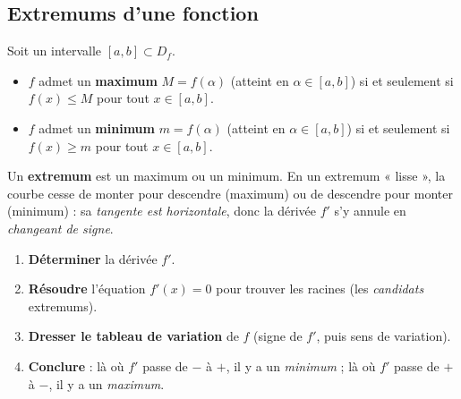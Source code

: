\documentclass[11pt,a4paper]{article}
\newcommand{\Df}{D_f}
\begin{document}
\subsection{Extremums d'une fonction}

\begin{definition}
Soit un intervalle $[a,b]\subset\Df$.
\begin{itemize}[leftmargin=1.5em,topsep=2pt]
  \item $f$ admet un \textbf{maximum} $M=f(\alpha)$ (atteint en $\alpha\in[a,b]$) si et
        seulement si $f(x)\leq M$ pour tout $x\in[a,b]$.
  \item $f$ admet un \textbf{minimum} $m=f(\alpha)$ (atteint en $\alpha\in[a,b]$) si et
        seulement si $f(x)\geq m$ pour tout $x\in[a,b]$.
\end{itemize}
Un \textbf{extremum} est un maximum ou un minimum. En un extremum « lisse », la courbe
cesse de monter pour descendre (maximum) ou de descendre pour monter (minimum) : sa
\emph{tangente est horizontale}, donc la dérivée $f'$ s'y annule en \emph{changeant de signe}.
\end{definition}

\begin{methode}
\begin{enumerate}[leftmargin=1.8em,topsep=2pt,itemsep=2pt]
  \item \textbf{Déterminer} la dérivée $f'$.
  \item \textbf{Résoudre} l'équation $f'(x)=0$ pour trouver les racines (les
        \emph{candidats} extremums).
  \item \textbf{Dresser le tableau de variation} de $f$ (signe de $f'$, puis sens de variation).
  \item \textbf{Conclure} : là où $f'$ passe de $-$ à $+$, il y a un \emph{minimum} ;
        là où $f'$ passe de $+$ à $-$, il y a un \emph{maximum}.
\end{enumerate}
\end{methode}
\end{document}
